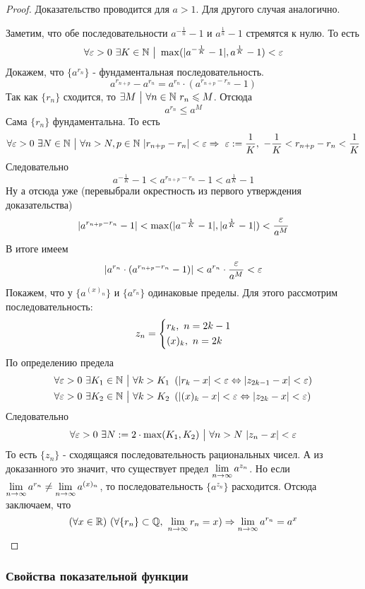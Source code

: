 \begin{proof}
	Доказательство проводится для $a > 1$. Для другого случая аналогично.
	
	Заметим, что обе последовательности $a^{-\frac{1}{n}} - 1$ и $a^{\frac{1}{n}} - 1$ стремятся к нулю. То есть
	\[
		\forall \varepsilon > 0\ \exists K \in \mathbb{N} \ \big|\  \max(|a^{-\frac{1}{K}} - 1|, a^{\frac{1}{K}} - 1) < \varepsilon
	\]
	Докажем, что $\{a^{r_n}\}$ - фундаментальная последовательность.
	\[
		a^{r_{n + p}} - a^{r_n} = a^{r_n} \cdot (a^{r_{n + p} - r_n} - 1)
	\]
	Так как $\{r_n\}$ сходится, то $\exists M \ \big|\  \forall n \in \mathbb{N}\ r_n \leqslant M$. Отсюда
	\[
		a^{r_n} \le a^M
	\]
	Сама $\{r_n\}$ фундаментальна. То есть
	\[
		\forall \varepsilon > 0\ \exists N \in \mathbb{N} \ \big|\  \forall n > N, p \in \mathbb{N}\ |r_{n + p} - r_n| < \varepsilon \Rightarrow\ \varepsilon := \frac{1}{K},\ -\frac{1}{K} < r_{n + p} - r_n < \frac{1}{K}
	\]
	Следовательно
	\[
		a^{-\frac{1}{K}} - 1 < a^{r_{n + p} - r_n} - 1 < a^{\frac{1}{K}} - 1
	\]
	Ну а отсюда уже (перевыбрали окрестность из первого утверждения доказательства)
	\[
		|a^{r_{n + p} - r_n} - 1| < \max(|a^{-\frac{1}{K}} - 1|, |a^{\frac{1}{K}} - 1|) < \frac{\varepsilon}{a^M}
	\]
	В итоге имеем
	\[
		|a^{r_n} \cdot (a^{r_{n + p} - r_n} - 1)| < a^{r_n} \cdot \frac{\varepsilon}{a^M} < \varepsilon
	\]
	Покажем, что у $\{a^{(x)_n}\}$ и $\{a^{r_n}\}$ одинаковые пределы. Для этого рассмотрим последовательность:
	\[
		z_n = \left\{\begin{aligned}
			&{r_k,\ n = 2k - 1}
			\\
			&{(x)_k,\ n = 2k}
		\end{aligned}\right.
	\]
	По определению предела
	\begin{align*}
		&\forall \varepsilon > 0\ \exists K_1 \in \mathbb{N} \ \big|\  \forall k > K_1\ \left(|r_k - x| < \varepsilon \Leftrightarrow |z_{2k - 1} - x| < \varepsilon\right)
		\\
		&\forall \varepsilon > 0\ \exists K_2 \in \mathbb{N} \ \big|\  \forall k > K_2\ \left(|(x)_k - x| < \varepsilon \Leftrightarrow |z_{2k} - x| < \varepsilon\right)
	\end{align*}
	Следовательно
	\[
		\forall \varepsilon > 0\ \exists N := 2 \cdot \max(K_1, K_2) \ \big|\  \forall n > N\ |z_n - x| < \varepsilon
	\]
	То есть $\{z_n\}$ - сходящаяся последовательность рациональных чисел. А из доказанного это значит, что существует предел $\lim\limits_{n \to \infty} a^{z_n}$. Но если $\lim\limits_{n \to \infty} a^{r_n} \neq \lim\limits_{n \to \infty} a^{(x)_n}$, то последовательность $\{a^{z_n}\}$ расходится. Отсюда заключаем, что
	\[
		(\forall x \in \mathbb{R})\ (\forall \{r_n\} \subset \mathbb{Q},\ \lim\limits_{n \to \infty} r_n = x) \Rightarrow \lim\limits_{n \to \infty} a^{r_n} = a^x
	\]
\end{proof}

\subsubsection*{Свойства показательной функции}


